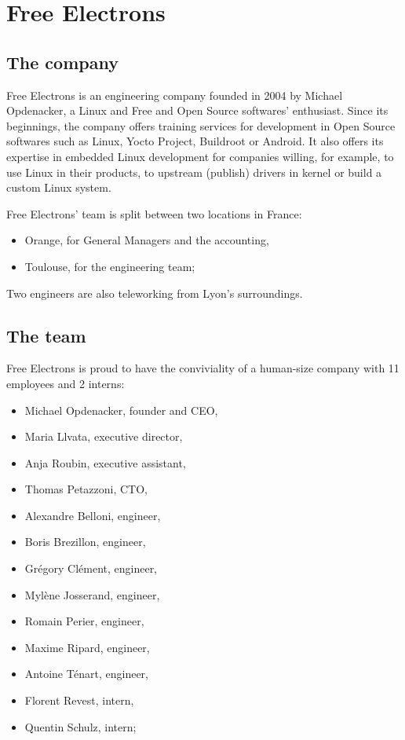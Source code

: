\chapter{Free Electrons}

\section{The company}
Free Electrons is an engineering company founded in 2004 by Michael Opdenacker, a Linux and Free and Open Source softwares' enthusiast. Since its beginnings, the company offers training services for development in Open Source softwares such as Linux, Yocto Project, Buildroot or Android. It also offers its expertise in embedded Linux development for companies willing, for example, to use Linux in their products, to upstream (publish) drivers in kernel or build a custom Linux system.

Free Electrons' team is split between two locations in France:
\begin{itemize}
  \item Orange, for General Managers and the accounting,
  \item Toulouse, for the engineering team;
\end{itemize}

Two engineers are also teleworking from Lyon's surroundings.

\section{The team}


Free Electrons is proud to have the conviviality of a human-size company with 11 employees and 2 interns:
\begin{itemize}
  \item Michael Opdenacker, founder and CEO,
  \item Maria Llvata, executive director,
  \item Anja Roubin, executive assistant,
  \item Thomas Petazzoni, CTO,
  \item Alexandre Belloni, engineer,
  \item Boris Brezillon, engineer,
  \item Grégory Clément, engineer,
  \item Mylène Josserand, engineer,
  \item Romain Perier, engineer,
  \item Maxime Ripard, engineer,
  \item Antoine Ténart, engineer,
  \item Florent Revest, intern,
  \item Quentin Schulz, intern;
\end{itemize}

